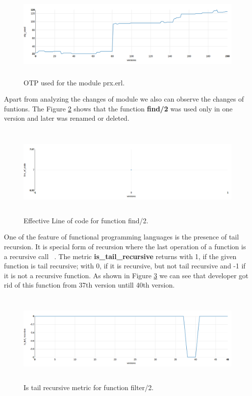 \begin{figure}[h]
	\centering
	\includegraphics[height=45mm]{figures/otp_prx.png}
	\caption{OTP used for the module prx.erl.}
	\label{fig:otp_prx}
\end{figure}

Apart from analyzing the changes of module we also can observe the changes of funtions. The Figure \ref{fig:find/2} shows that the function \textbf{find/2} was used only in one version and later was renamed or deleted.

\begin{figure}[h]
	\centering
	\includegraphics[height=45mm]{figures/find2.png}
	\caption{Effective Line of code for function find/2.}
	\label{fig:find/2}
\end{figure}

One of the feature of functional programming languages is the presence of tail recursion. It is special form of recursion where the last operation of a function is a recursive call ~\cite{tail}.
The metric \textbf{is\_tail\_recursive} returns with 1, if the given function
is tail recursive; with 0, if it is recursive, but not tail recursive 
and -1 if it is not a recursive function. As shown in Figure \ref{fig:tail1}
we can see that developer got rid of this function from 37th version untill 40th version.

\begin{figure}[h]
	\centering
	\includegraphics[height=45mm]{figures/filter2.png}
	\caption{Is tail recursive metric for function filter/2.}
	\label{fig:tail1}
\end{figure}

